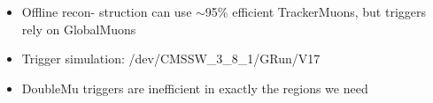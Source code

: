 \documentclass[compress]{beamer}
\begin{document}
\begin{frame}
\begin{columns}

\vspace{-0.5 cm}
\begin{itemize}
\item Offline recon- struction can use $\sim$95\% efficient
  TrackerMuons, but triggers rely on GlobalMuons

\item Trigger simulation: {\tiny /dev/CMSSW\_3\_8\_1/GRun/V17}

\item DoubleMu triggers are inefficient in exactly the regions we need
\end{itemize}

\end{columns}
\end{frame}
\end{document}
